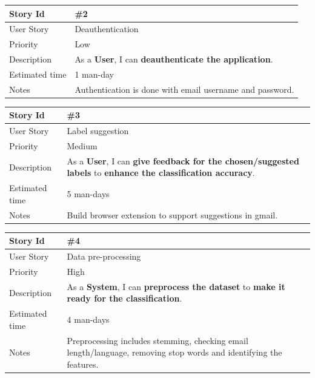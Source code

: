 \begin{tabular}{|p{3cm}|p{10cm}|}
\hline
\cellcolor[gray]{0.9} Story Id & \#2 \\ \hline
\cellcolor[gray]{0.9} User Story & Deauthentication \\ \hline
\cellcolor[gray]{0.9} Priority & Low \\ \hline
\cellcolor[gray]{0.9} Description & 
	As a \textbf{User}, I can \textbf{deauthenticate the application}. \\ \hline
\cellcolor[gray]{0.9} Estimated time & 1 man-day \\ \hline
\cellcolor[gray]{0.9} Notes & 
	Authentication is done with email username and password. \\ \hline
\end{tabular}

\begin{tabular}{|p{3cm}|p{10cm}|}
\hline
\cellcolor[gray]{0.9} Story Id & \#3 \\ \hline
\cellcolor[gray]{0.9} User Story & Label suggestion \\ \hline
\cellcolor[gray]{0.9} Priority & Medium\\ \hline
\cellcolor[gray]{0.9} Description & 
	As a \textbf{User}, I can \textbf{give feedback for the chosen/suggested labels} to
	\textbf{enhance the classification accuracy}. \\ \hline
\cellcolor[gray]{0.9} Estimated time & 5 man-days\\ \hline
\cellcolor[gray]{0.9} Notes & 
	Build browser extension to support suggestions in gmail. \\ \hline
\end{tabular}

\begin{tabular}{|p{3cm}|p{10cm}|}
\hline
\cellcolor[gray]{0.9} Story Id & \#4 \\ \hline
\cellcolor[gray]{0.9} User Story & Data pre-processing \\ \hline
\cellcolor[gray]{0.9} Priority & High\\ \hline
\cellcolor[gray]{0.9} Description & 
	As a \textbf{System}, I can \textbf{preprocess the dataset} to
	\textbf{make it ready for the classification}. \\ \hline
\cellcolor[gray]{0.9} Estimated time & 4 man-days\\ \hline
\cellcolor[gray]{0.9} Notes & 
	Preprocessing includes stemming, checking email length/language,
	removing stop words and identifying the features. \\ \hline
\end{tabular}

